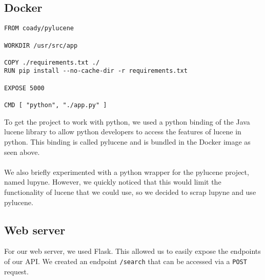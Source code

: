 \documentclass{article}
\begin{document}
\subsection{Docker}
\begin{lstlisting}
FROM coady/pylucene

WORKDIR /usr/src/app

COPY ./requirements.txt ./
RUN pip install --no-cache-dir -r requirements.txt

EXPOSE 5000

CMD [ "python", "./app.py" ]
\end{lstlisting}
To get the project to work with python, we used a python binding of the Java lucene
library to allow python developers to access the features of lucene in python. This
binding is called pylucene and is bundled in the Docker image as seen above.
\\~\\
We also briefly experimented with a python wrapper for the pylucene project, named lupyne.
However, we quickly noticed that this would limit the functionality of lucene
that we could use, so we decided to scrap lupyne and use pylucene.
\subsection{Web server}
For our web server, we used Flask. This allowed us to easily expose the endpoints
of our API. We created an endpoint \texttt{/search} that can be accessed via
a \texttt{POST} request.
\end{document}
